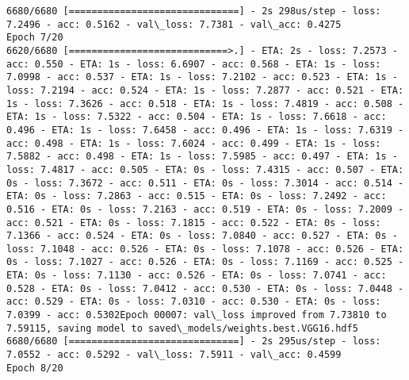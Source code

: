 \documentclass[11pt]{article}
\begin{document}
\begin{Verbatim}[commandchars=\\\{\}]
6680/6680 [==============================] - 2s 298us/step - loss: 7.2496 - acc: 0.5162 - val\_loss: 7.7381 - val\_acc: 0.4275
Epoch 7/20
6620/6680 [============================>.] - ETA: 2s - loss: 7.2573 - acc: 0.550 - ETA: 1s - loss: 6.6907 - acc: 0.568 - ETA: 1s - loss: 7.0998 - acc: 0.537 - ETA: 1s - loss: 7.2102 - acc: 0.523 - ETA: 1s - loss: 7.2194 - acc: 0.524 - ETA: 1s - loss: 7.2877 - acc: 0.521 - ETA: 1s - loss: 7.3626 - acc: 0.518 - ETA: 1s - loss: 7.4819 - acc: 0.508 - ETA: 1s - loss: 7.5322 - acc: 0.504 - ETA: 1s - loss: 7.6618 - acc: 0.496 - ETA: 1s - loss: 7.6458 - acc: 0.496 - ETA: 1s - loss: 7.6319 - acc: 0.498 - ETA: 1s - loss: 7.6024 - acc: 0.499 - ETA: 1s - loss: 7.5882 - acc: 0.498 - ETA: 1s - loss: 7.5985 - acc: 0.497 - ETA: 1s - loss: 7.4817 - acc: 0.505 - ETA: 0s - loss: 7.4315 - acc: 0.507 - ETA: 0s - loss: 7.3672 - acc: 0.511 - ETA: 0s - loss: 7.3014 - acc: 0.514 - ETA: 0s - loss: 7.2863 - acc: 0.515 - ETA: 0s - loss: 7.2492 - acc: 0.516 - ETA: 0s - loss: 7.2163 - acc: 0.519 - ETA: 0s - loss: 7.2009 - acc: 0.521 - ETA: 0s - loss: 7.1815 - acc: 0.522 - ETA: 0s - loss: 7.1366 - acc: 0.524 - ETA: 0s - loss: 7.0840 - acc: 0.527 - ETA: 0s - loss: 7.1048 - acc: 0.526 - ETA: 0s - loss: 7.1078 - acc: 0.526 - ETA: 0s - loss: 7.1027 - acc: 0.526 - ETA: 0s - loss: 7.1169 - acc: 0.525 - ETA: 0s - loss: 7.1130 - acc: 0.526 - ETA: 0s - loss: 7.0741 - acc: 0.528 - ETA: 0s - loss: 7.0412 - acc: 0.530 - ETA: 0s - loss: 7.0448 - acc: 0.529 - ETA: 0s - loss: 7.0310 - acc: 0.530 - ETA: 0s - loss: 7.0399 - acc: 0.5302Epoch 00007: val\_loss improved from 7.73810 to 7.59115, saving model to saved\_models/weights.best.VGG16.hdf5
6680/6680 [==============================] - 2s 295us/step - loss: 7.0552 - acc: 0.5292 - val\_loss: 7.5911 - val\_acc: 0.4599
Epoch 8/20

\end{Verbatim}
\end{document}
